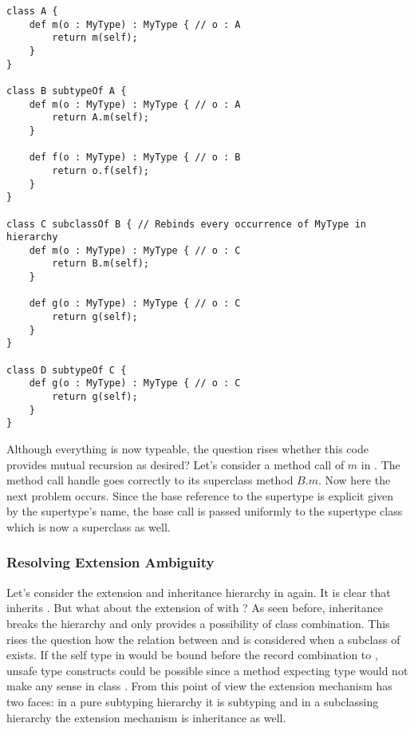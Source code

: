 \begin{lstlisting}[float=ht,language=ooplss,caption=Binding of \self and \mytype in a mixed context,label=lst:bindingInMixedHierarchy]
class A {
	def m(o : MyType) : MyType { // o : A
		return m(self);
	}
}

class B subtypeOf A {
	def m(o : MyType) : MyType { // o : A
		return A.m(self);
	}

	def f(o : MyType) : MyType { // o : B
		return o.f(self);
	}
}

class C subclassOf B { // Rebinds every occurrence of MyType in hierarchy
	def m(o : MyType) : MyType { // o : C
		return B.m(self);
	}

	def g(o : MyType) : MyType { // o : C
		return g(self);
	}
}

class D subtypeOf C {
	def g(o : MyType) : MyType { // o : C
		return g(self);
	}
}
\end{lstlisting}

Although everything is now typeable, the question rises whether this code
provides mutual recursion as desired? Let's consider a method call of $m$
in \C. The method call handle goes correctly to its superclass method
$B.m$. Now here the next problem occurs. Since the base reference
to the supertype is explicit given by the supertype's name, the base call
is passed uniformly to the supertype class which is now a superclass as well.

%

\subsubsection{Resolving Extension Ambiguity}
\label{sec:resolveAmbiguity}
Let's consider the extension and inheritance hierarchy in 
again. It is clear that \C inherits \B. But what about the extension of \A
with \B? As seen before, inheritance breaks the hierarchy and only
provides a possibility of class combination. This rises the question how the
relation between \A and \B is considered when a subclass of \B exists. If
the self type in \A would be bound before the record combination to
\C, unsafe type constructs could be possible since a
method expecting type \A would not make any sense in class \C. From this
point of view the extension mechanism has two faces: in a pure
subtyping hierarchy it is subtyping and in a subclassing hierarchy the
extension mechanism is inheritance as well.

